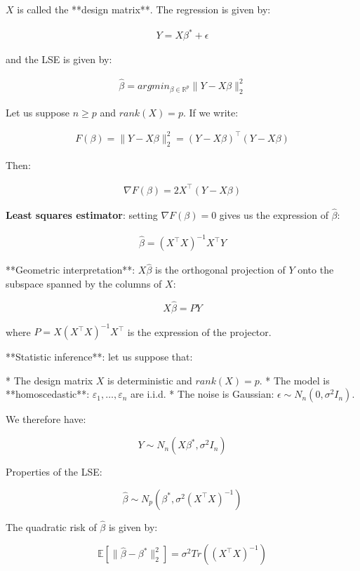 $X$ is called the **design matrix**. The regression is given by:

\begin{align*}
Y = X\beta^{*} + \epsilon
\end{align*}

and the LSE is given by:

\begin{align*}
\hat{\beta} = argmin_{\beta \in \mathbb{R}^p} \|Y - X\beta\|^2_2
\end{align*}


Let us suppose $n \geq p$ and $rank(X) = p$. If we write:

\begin{align*}
F(\beta)  = \|Y - X\beta\|^2_2 = (Y - X\beta)^\top(Y - X\beta)
\end{align*}


Then:

\begin{align*}
\nabla F(\beta) = 2 X^\top(Y - X\beta)
\end{align*}


\textbf{Least squares estimator}: setting $\nabla F(\beta) = 0$ gives us the expression of $\hat{\beta}$:

\begin{align*}
\hat{\beta} = (X^\top X)^{-1}X^\top Y
\end{align*}


**Geometric interpretation**: $X\hat{\beta}$ is the orthogonal projection of $Y$ onto the subspace spanned by the columns of $X$:

$$ X\hat{\beta} = PY$$

where $P = X(X^\top X)^{-1}X^\top$ is the expression of the projector.

**Statistic inference**: let us suppose that:

* The design matrix $X$ is deterministic and $rank(X) = p$.
* The model is **homoscedastic**: $\varepsilon_1, \ldots, \varepsilon_n$ are i.i.d.
* The noise is Gaussian: $\epsilon \sim N_n(0, \sigma^2I_n)$.

We therefore have:

$$Y \sim N_n(X\beta^{*}, \sigma^2 I_n)$$

Properties of the LSE:

$$\hat{\beta} \sim N_p(\beta^{*}, \sigma^2(X^\top X)^{-1})$$

The quadratic risk of $\hat{\beta}$ is given by:

$$\mathbb{E}\left[\|\hat{\beta} - \beta^{*}\|^2_2\right] = \sigma^2 Tr \left((X^\top X)^{-1}\right)$$

